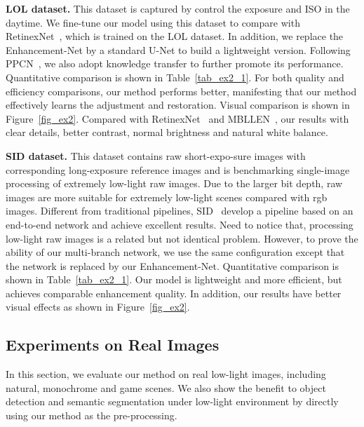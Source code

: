 {\bf LOL dataset.} This dataset is captured by control the exposure and ISO in the daytime. We fine-tune our model using this dataset to compare with RetinexNet~\cite{seedark2018cvpr}, which is trained on the LOL dataset. In addition, we replace the Enhancement-Net by a standard U-Net to build a lightweight version. Following PPCN~\cite{Hui-PPCN-2018}, we also adopt knowledge transfer to further promote its performance. Quantitative comparison is shown in Table~\ref{tab_ex2_1}. For both quality and efficiency comparisons, our method performs better, manifesting that our method effectively learns the adjustment and restoration. Visual comparison is shown in Figure~\ref{fig_ex2}. Compared with RetinexNet~\cite{Chen2018Retinex} and MBLLEN~\cite{lvmbllen}, our results with clear details, better contrast, normal brightness and natural white balance.


{\bf SID dataset.} This dataset contains raw short-expo-sure images with corresponding long-exposure reference images and is benchmarking single-image processing of extremely low-light raw images. Due to the larger bit depth, raw images are more suitable for extremely low-light scenes compared with rgb images. Different from traditional pipelines, SID~\cite{seedark2018cvpr} develop a pipeline based on an end-to-end network and achieve excellent results. Need to notice that, processing low-light raw images is a related but not identical problem. However, to prove the ability of our multi-branch network, we use the same configuration except that the network is replaced by our Enhancement-Net. Quantitative comparison is shown in Table~\ref{tab_ex2_1}. Our model is lightweight and more efficient, but achieves comparable enhancement quality. In addition, our results have better visual effects as shown in Figure~\ref{fig_ex2}.

\subsection{Experiments on Real Images}
In this section, we evaluate our method on real low-light images, including natural, monochrome and game scenes. We also show the benefit to object detection and semantic segmentation under low-light environment by directly using our method as the pre-processing.

